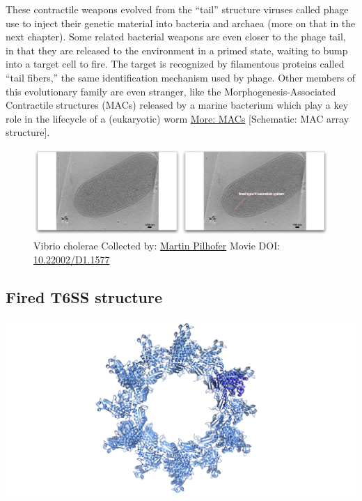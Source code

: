 \documentclass[]{tufte-book}
\begin{document}
These contractile weapons evolved from the ``tail'' structure viruses
called phage use to inject their genetic material into bacteria and
archaea (more on that in the next chapter). Some related bacterial
weapons are even closer to the phage tail, in that they are released to
the environment in a primed state, waiting to bump into a target cell to
fire. The target is recognized by filamentous proteins called ``tail
fibers,'' the same identification mechanism used by phage. Other members
of this evolutionary family are even stranger, like the
Morphogenesis-Associated Contractile structures (MACs) released by a
marine bacterium which play a key role in the lifecycle of a
(eukaryotic) worm \protect\hyperlink{MACs}{More: MACs} {[}Schematic: MAC
array structure{]}.





\begin{figure}
\includegraphics{movie_stills/9_7} \caption[Vibrio cholerae Collected by:
\protect\hyperlink{martin_pilhofer}{Martin Pilhofer} Movie DOI:
\href{https://doi.org/10.22002/D1.1577}{10.22002/D1.1577}]{Vibrio cholerae Collected by:
\protect\hyperlink{martin_pilhofer}{Martin Pilhofer} Movie DOI:
\href{https://doi.org/10.22002/D1.1577}{10.22002/D1.1577}}\label{fig:9-7}
\end{figure}

\subsection{Fired T6SS structure}\label{Fired_T6SS_structure}

\includegraphics{img/schematics/9_7_1}
\end{document}

